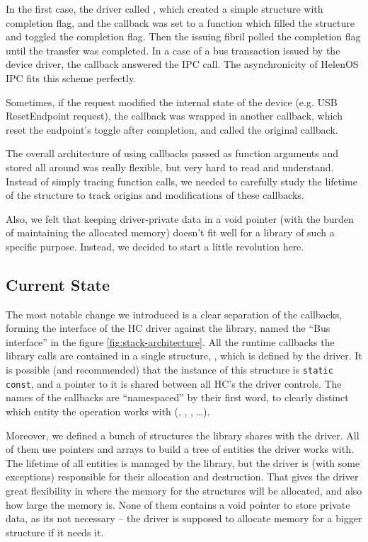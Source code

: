 In the first case, the driver called , which created
a simple structure with completion flag, and the callback was set to a function
which filled the structure and toggled the completion flag. Then the issuing
fibril polled the completion flag until the transfer was completed. In a case
of a bus transaction issued by the device driver, the callback answered the IPC
call. The asynchronicity of HelenOS IPC fits this scheme perfectly.

Sometimes, if the request modified the internal state of the device (e.g. USB
ResetEndpoint request), the callback was wrapped in another callback, which
reset the endpoint's toggle after completion, and called the original callback.

The overall architecture of using callbacks passed as function arguments and
stored all around was really flexible, but very hard to read and understand.
Instead of simply tracing function calls, we needed to carefully study the
lifetime of the structure to track origins and modifications of these
callbacks.

Also, we felt that keeping driver-private data in a void pointer (with the
burden of maintaining the allocated memory) doesn't fit well for a library of
such a specific purpose. Instead, we decided to start a little revolution here.

\subsection{Current State}

The most notable change we introduced is a clear separation of the callbacks,
forming the interface of the HC driver against the  library,
named the ``Bus interface'' in the figure \ref{fig:stack-architecture}. All the
runtime callbacks the library calls are contained in a single structure,
, which is defined by the driver. It is possible (and
recommended) that the instance of this structure is \texttt{static
const}, and a pointer to it is shared between all HC's the driver controls. The
names of the callbacks are ``namespaced'' by their first word, to clearly
distinct which entity the operation works with (,
, , \dots).

Moreover, we defined a bunch of structures the library shares with the driver.
All of them use pointers and arrays to build a tree of entities the driver
works with. The lifetime of all entities is managed by the library, but the
driver is (with some exceptions) responsible for their allocation and
destruction. That gives the driver great flexibility in where the memory for
the structures will be allocated, and also how large the memory is. None of
them contains a void pointer to store private data, as its not necessary -- the
driver is supposed to allocate memory for a bigger structure if it needs it.

